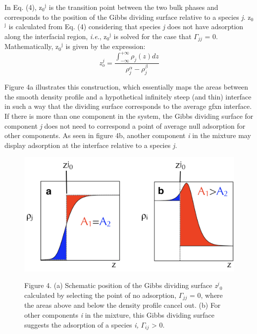 \documentclass{scrbook}
\begin{document}
In Eq. (4), z$_{0}$$^{\mathrm{j}}$ is the transition point between the two bulk
phases and corresponds to the position of the Gibbs dividing surface relative
to a species \textit{j}. z$_{0}$$^{\mathrm{j}}$ is calculated from Eq. (4)
considering that species \textit{j} does not have adsorption along the
interfacial region, \textit{i.e}., z$_{0}$$^{\mathrm{j}}$ is solved for the
case that ${\Gamma}$$_{jj}$ = 0. Mathematically, z$_{0}$$^{\mathrm{j}}$ is
given by the expression:
\begin{equation}
z_{o}^{j}=\frac{\int_{-\infty}^{+\infty}\rho_{j}\left(z\right)dz}{\rho_{j}^{\alpha}-\rho_{j}^{\beta}}
\end{equation}

Figure 4a illustrates this construction, which essentially maps the areas
between the smooth density profile and a hypothetical infinitely steep (and
thin) interface in such a way that the dividing surface corresponds to the
average gfxn interface. If there is more than one component in the system, the
Gibbs dividing surface for component \textit{j} does not need to correspond
a point of average null adsorption for other components. As seen in figure 4b,
another component \textit{i} in the mixture may display adsorption at the
interface relative to a species \textit{j.}

\begin{figure}
\caption{Figure 4. (a) Schematic position of the Gibbs dividing surface \textit{z}$^{j}$$_{0 }$calculated by selecting the point of no adsorption, ${\Gamma}$$_{jj}$ = 0, where the areas above and below the density profile cancel out. (b) For other components \textit{i}  in the mixture, this Gibbs dividing surface suggests the adsorption of a species \textit{i,} ${\Gamma}$$_{ij}$ {\textgreater} 0.}
\includegraphics[width=1\textwidth]{gfx/image11.png}
\label{fig:3}
\end{figure}
\end{document}
